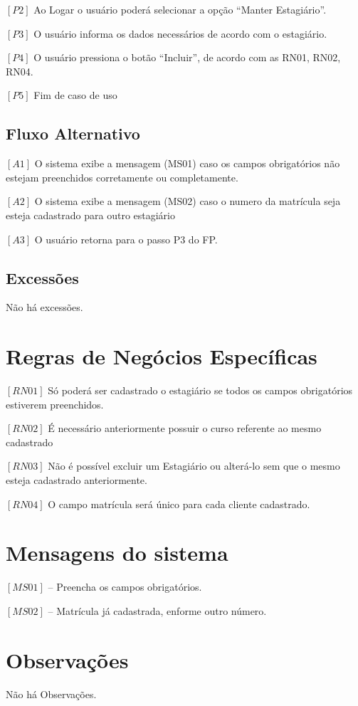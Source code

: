 \textbf{$[P2]$} Ao Logar o usuário poderá selecionar a opção “Manter Estagiário”.

\textbf{$[P3]$} O usuário informa os dados necessários de acordo com o estagiário.

\textbf{$[P4]$} O usuário pressiona o botão “Incluir”, de acordo com as RN01, RN02, RN04.

\textbf{$[P5]$} Fim de caso de uso

\subsection{Fluxo Alternativo}

$[A1]$ O sistema exibe a mensagem (MS01) caso os campos obrigatórios não estejam preenchidos
corretamente ou completamente.

$[A2]$ O sistema exibe a mensagem (MS02) caso o numero da matrícula seja esteja cadastrado para
outro estagiário

$[A3]$ O usuário retorna para o passo P3 do FP.

\subsection{Excessões}

Não há excessões.

\section{Regras de Negócios Específicas}

$[RN01]$ Só poderá ser cadastrado o estagiário se todos os campos obrigatórios estiverem
preenchidos.

$[RN02]$ É necessário anteriormente possuir o curso referente ao mesmo cadastrado

$[RN03]$ Não é possível excluir um Estagiário ou alterá-lo sem que o mesmo esteja
cadastrado anteriormente.

$[RN04]$ O campo matrícula será único para cada cliente cadastrado.


\section{Mensagens do sistema}

$[MS01]$ – Preencha os campos obrigatórios.

$[MS02]$ – Matrícula já cadastrada, enforme outro número.

\section{Observações}

Não há Observações.


